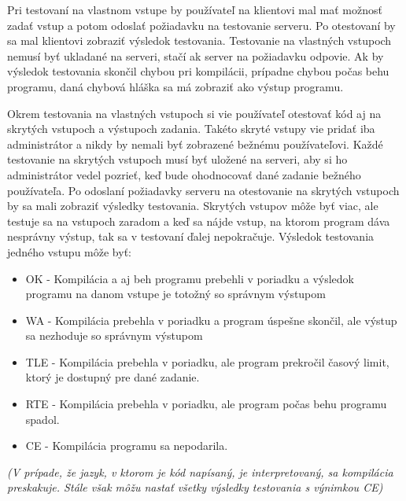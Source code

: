 Pri testovaní na vlastnom vstupe by používateľ na klientovi mal mať možnosť zadať vstup a potom
odoslať požiadavku na testovanie serveru. Po otestovaní by sa mal klientovi zobraziť výsledok
testovania. Testovanie na vlastných vstupoch nemusí byť ukladané na serveri, stačí ak server na
požiadavku odpovie. Ak by výsledok testovania skončil chybou pri kompilácii, prípadne chybou počas
behu programu, daná chybová hláška sa má zobraziť ako výstup programu.

Okrem testovania na vlastných vstupoch si vie používateľ otestovať kód aj na skrytých vstupoch a
výstupoch zadania. Takéto skryté vstupy vie pridať iba administrátor a nikdy by nemali byť zobrazené
bežnému používateľovi. Každé testovanie na skrytých vstupoch musí byť uložené na serveri, aby si ho
administrátor vedel pozrieť, keď bude ohodnocovať dané zadanie bežného používateľa. Po odoslaní
požiadavky serveru na otestovanie na skrytých vstupoch by sa mali zobraziť výsledky testovania.
Skrytých vstupov môže byť viac, ale testuje sa na vstupoch zaradom a keď sa nájde vstup, na ktorom
program dáva nesprávny výstup, tak sa v testovaní ďalej nepokračuje.
Výsledok testovania jedného vstupu môže byť:
\begin{itemize}
\item OK - Kompilácia a aj beh programu prebehli v poriadku a výsledok programu na danom vstupe
je totožný so správnym výstupom
\item WA - Kompilácia prebehla v poriadku a program úspešne skončil, ale výstup sa nezhoduje so
správnym výstupom
\item TLE - Kompilácia prebehla v poriadku, ale program prekročil časový limit, ktorý je dostupný 
pre dané zadanie.
\item RTE - Kompilácia prebehla v poriadku, ale program počas behu programu spadol.
\item CE - Kompilácia programu sa nepodarila.
\end{itemize}
\textit{(V prípade, že jazyk, v ktorom je kód napísaný, je interpretovaný, sa kompilácia preskakuje.
Stále však môžu nastať všetky výsledky testovania s výnimkou CE)}
